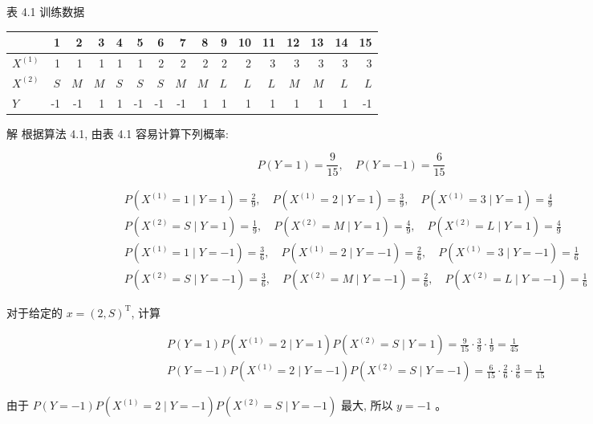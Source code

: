 \documentclass[10pt]{article}
\begin{document}
表 4.1 训练数据

\begin{center}
\begin{tabular}{lrrrrrrrrrrrrrrr}
\hline
 & 1 & 2 & 3 & 4 & 5 & 6 & 7 & 8 & 9 & 10 & 11 & 12 & 13 & 14 & 15 \\
\hline
$X^{(1)}$ & 1 & 1 & 1 & 1 & 1 & 2 & 2 & 2 & 2 & 2 & 3 & 3 & 3 & 3 & 3 \\
$X^{(2)}$ & $S$ & $M$ & $M$ & $S$ & $S$ & $S$ & $M$ & $M$ & $L$ & $L$ & $L$ & $M$ & $M$ & $L$ & $L$ \\
$Y$ & -1 & -1 & 1 & 1 & -1 & -1 & -1 & 1 & 1 & 1 & 1 & 1 & 1 & 1 & -1 \\
\hline
\end{tabular}
\end{center}

解 根据算法 4.1, 由表 4.1 容易计算下列概率:

$$
P(Y=1)=\frac{9}{15}, \quad P(Y=-1)=\frac{6}{15}
$$

$$
\begin{aligned}
& P\left(X^{(1)}=1 \mid Y=1\right)=\frac{2}{9}, \quad P\left(X^{(1)}=2 \mid Y=1\right)=\frac{3}{9}, \quad P\left(X^{(1)}=3 \mid Y=1\right)=\frac{4}{9} \\
& P\left(X^{(2)}=S \mid Y=1\right)=\frac{1}{9}, \quad P\left(X^{(2)}=M \mid Y=1\right)=\frac{4}{9}, \quad P\left(X^{(2)}=L \mid Y=1\right)=\frac{4}{9} \\
& P\left(X^{(1)}=1 \mid Y=-1\right)=\frac{3}{6}, \quad P\left(X^{(1)}=2 \mid Y=-1\right)=\frac{2}{6}, \quad P\left(X^{(1)}=3 \mid Y=-1\right)=\frac{1}{6} \\
& P\left(X^{(2)}=S \mid Y=-1\right)=\frac{3}{6}, \quad P\left(X^{(2)}=M \mid Y=-1\right)=\frac{2}{6}, \quad P\left(X^{(2)}=L \mid Y=-1\right)=\frac{1}{6}
\end{aligned}
$$

对于给定的 $x=(2, S)^{\mathrm{T}}$, 计算

$$
\begin{aligned}
& P(Y=1) P\left(X^{(1)}=2 \mid Y=1\right) P\left(X^{(2)}=S \mid Y=1\right)=\frac{9}{15} \cdot \frac{3}{9} \cdot \frac{1}{9}=\frac{1}{45} \\
& P(Y=-1) P\left(X^{(1)}=2 \mid Y=-1\right) P\left(X^{(2)}=S \mid Y=-1\right)=\frac{6}{15} \cdot \frac{2}{6} \cdot \frac{3}{6}=\frac{1}{15}
\end{aligned}
$$

由于 $P(Y=-1) P\left(X^{(1)}=2 \mid Y=-1\right) P\left(X^{(2)}=S \mid Y=-1\right)$ 最大, 所以 $y=-1$ 。
\end{document}
